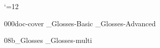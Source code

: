 



 \catcode`\@=12












\get 000doc-cover
_Glosses-Basic
_Glosses-Advanced
%
%


\bye
\get 08b_Glosses
_Glosses-multi

